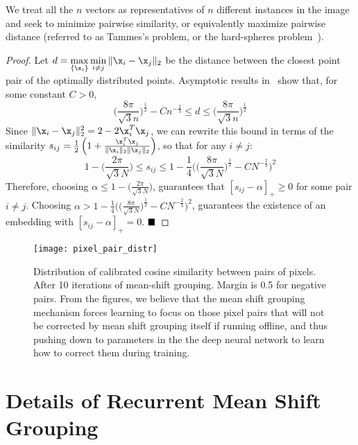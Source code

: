 We treat all the $n$ vectors as representatives of $n$ different instances in
the image and seek to minimize pairwise similarity, or equivalently maximize
pairwise distance (referred to as Tammes's problem, or the hard-spheres
problem~\cite{saff1997distributing}).

\begin{proof}
Let $d  = \max\limits_{\{\x_i\}} \min\limits_{i\not=j}\Vert \x_i-\x_j\Vert_2$
be the distance between the closest point pair of the optimally distributed
points.  Asymptotic results in~\cite{habicht1951lagerung} show that, for some
constant $C>0$,
\begin{equation}
  \Big(\frac{8\pi}{\sqrt{3}n}\Big)^{\frac{1}{2}} -Cn^{-\frac{2}{3}} \le d \le \Big( \frac{8\pi}{\sqrt{3}n} \Big)^{\frac{1}{2}}
\end{equation}
Since $\Vert \x_i-\x_j\Vert_2^2=2-2\x_i^T \x_j$, we can rewrite this bound in
terms of the similarity
$s_{ij} = \frac{1}{2}\left(1 + \frac{\x_i^T\x_j}{\Vert\x_i\Vert_2 \Vert\x_j\Vert_2}\right)$,
so that for any $i \not= j$:
\begin{equation}
1- \Big( \frac{2\pi}{\sqrt{3}N} \Big) \le s_{ij} \le  1- \frac{1}{4} \Bigg( \Big(\frac{8\pi}{\sqrt{3}N}\Big)^{\frac{1}{2}} -CN^{-\frac{2}{3}}\Bigg)^2
\end{equation}
Therefore, choosing $\alpha \leq 1- \Big( \frac{2\pi}{\sqrt{3}N} \Big)$,
guarantees that $[s_{ij}-\alpha]_{+}\geq 0$ for some pair $i \not= j$. Choosing
$\alpha > 1- \frac{1}{4} \Bigg( \Big(\frac{8\pi}{\sqrt{3}N}\Big)^{\frac{1}{2}}
-CN^{-\frac{2}{3}}\Bigg)^2$, guarantees the existence of an embedding with
$[s_{ij}-\alpha]_{+}=0$.
$\hfill\blacksquare$
\end{proof}

\begin{figure*}[t]
\centering
   \texttt{[image: pixel\_pair\_distr]}
   \caption{Distribution of calibrated cosine similarity between pairs of pixels.
   After 10 iterations of mean-shift grouping.  Margin is 0.5 for negative
   pairs.  From the figures, we believe that the mean shift grouping mechanism
   forces learning to focus on those pixel pairs that will not be corrected by
   mean shift grouping itself if running offline, and thus pushing down to
   parameters in the the deep neural network to learn how to correct them
   during training.
   }
\label{fig:pixel_pair_distr}
\end{figure*}


\section{Details of Recurrent Mean Shift Grouping }

